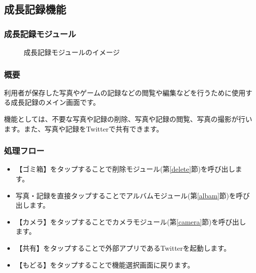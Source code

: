 \documentclass[a4j]{jarticle}
\begin{document}
\subsection{成長記録機能}
\subsubsection{成長記録モジュール\label{grow}}
\begin{figure}[H]
    \begin{center}
    \caption {成長記録モジュールのイメージ}
    \label{functionselection}
    \end{center}
\end{figure}


\subsubsection*{概要}
利用者が保存した写真やゲームの記録などの閲覧や編集などを行うために使用する成長記録のメイン画面です。

機能としては、不要な写真や記録の削除、写真や記録の閲覧、写真の撮影が行います。また、写真や記録をTwitterで共有できます。

\subsubsection*{処理フロー}
\begin{itemize}
\item 【ゴミ箱】をタップすることで削除モジュール(第\ref{delete}節)を呼び出します。

\item 写真・記録を直接タップすることでアルバムモジュール(第\ref{albam}節)を呼び出します。

\item 【カメラ】をタップすることでカメラモジュール(第\ref{camera}節)を呼び出します。

\item 【共有】をタップすることで外部アプリであるTwitterを起動します。

\item 【もどる】をタップすることで機能選択画面に戻ります。
\end{itemize}
\end{document}
